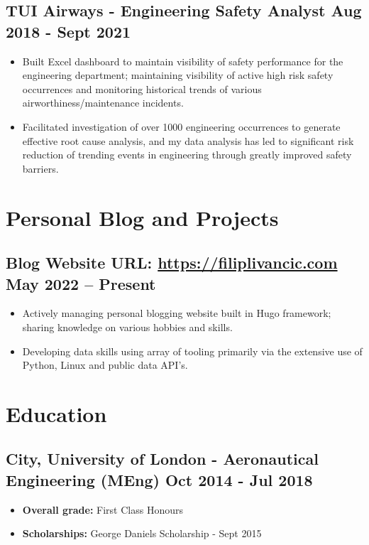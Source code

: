 \documentclass[a4paper,9pt]{article}
\begin{document}
\subsection*{\textbf{TUI Airways - Engineering Safety Analyst} \hfill  Aug 2018 - Sept 2021}
\begin{itemize}[noitemsep]
	\item Built Excel dashboard to maintain visibility of safety performance for the engineering department; maintaining visibility of active high risk safety occurrences and monitoring historical trends of various airworthiness/maintenance incidents.
	\item Facilitated investigation of over 1000 engineering occurrences to generate effective root cause analysis, and my data analysis has led to significant risk reduction of trending events in engineering through greatly improved safety barriers.
\end{itemize}

\section*{Personal Blog and Projects}

\subsection*{\textbf{Blog Website URL}: \url{https://filiplivancic.com} \hfill  May 2022 – Present}
\begin{itemize}[noitemsep]
	\item  Actively managing personal blogging website built in Hugo framework; sharing knowledge on various hobbies and skills.
    \item  Developing data skills using array of tooling primarily via the extensive use of Python, Linux and public data API's.
\end{itemize}

\section*{Education}
\subsection*{\textbf {City, University of London - Aeronautical Engineering (MEng)}  \hfill Oct 2014 - Jul 2018}\FloatBarrier
\begin{itemize}[noitemsep]
	\item \textbf{Overall grade:} First Class Honours %
    \item \textbf{Scholarships:} \hspace{0mm} George Daniels Scholarship - Sept 2015
\end{itemize}
\end{document}
